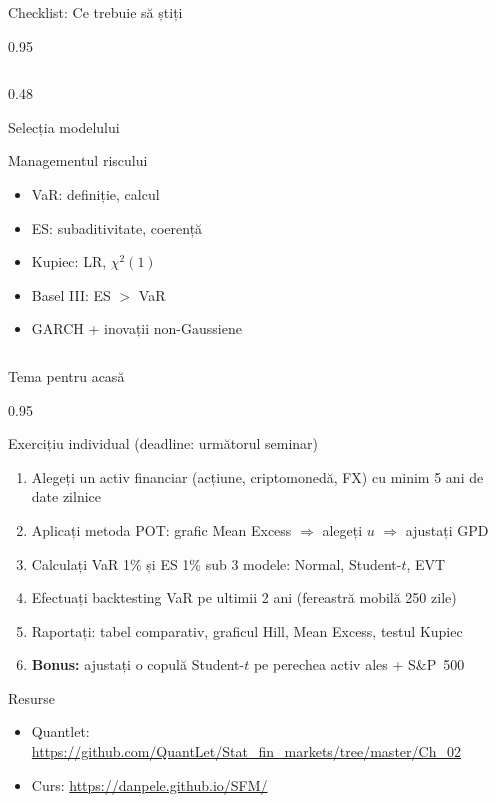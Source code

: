 \documentclass[9pt, aspectratio=169, t]{beamer}
\begin{document}
\begin{frame}{Checklist: Ce trebuie să știți}
\begin{cminipage}{0.95\textwidth}
\begin{columns}[T]
\begin{column}{0.48\textwidth}
\begin{block}{Selecția modelului}
\begin{itemize}
\end{itemize}
\end{block}
\begin{block}{Managementul riscului}
\begin{itemize}\setlength{\itemsep}{0pt}
    \item[$\square$] VaR: definiție, calcul
    \item[$\square$] ES: subaditivitate, coerență
    \item[$\square$] Kupiec: LR, $\chi^2(1)$
    \item[$\square$] Basel III: ES $>$ VaR
    \item[$\square$] GARCH + inovații non-Gaussiene
\end{itemize}
\end{block}
\end{column}
\end{columns}
    \end{cminipage}
\end{frame}

\begin{frame}{Tema pentru acasă}
    \begin{cminipage}{0.95\textwidth}
\begin{alertblock}{Exercițiu individual (deadline: următorul seminar)}
\begin{enumerate}\setlength{\itemsep}{3pt}
    \item Alegeți un activ financiar (acțiune, criptomonedă, FX) cu minim 5 ani de date zilnice
    \item Aplicați metoda POT: grafic Mean Excess $\Rightarrow$ alegeți $u$ $\Rightarrow$ ajustați GPD
    \item Calculați VaR 1\% și ES 1\% sub 3 modele: Normal, Student-$t$, EVT
    \item Efectuați backtesting VaR pe ultimii 2 ani (fereastră mobilă 250 zile)
    \item Raportați: tabel comparativ, graficul Hill, Mean Excess, testul Kupiec
    \item \textbf{Bonus:} ajustați o copulă Student-$t$ pe perechea activ ales + S\&P~500
\end{enumerate}
\end{alertblock}

\begin{exampleblock}{Resurse}
\begin{itemize}\setlength{\itemsep}{0pt}
    \item Quantlet: \url{https://github.com/QuantLet/Stat_fin_markets/tree/master/Ch_02}
    \item Curs: \url{https://danpele.github.io/SFM/}
\end{itemize}
\end{exampleblock}
    \end{cminipage}
\end{frame}
\end{document}
